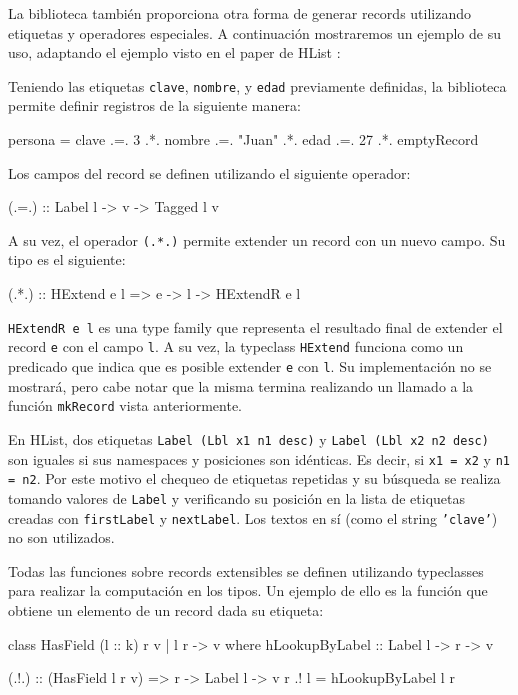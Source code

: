 La biblioteca también proporciona otra forma de generar records utilizando etiquetas y operadores especiales. A continuación mostraremos un ejemplo de su uso, adaptando el ejemplo visto en el paper de HList :

Teniendo las etiquetas \texttt{clave}, \texttt{nombre}, y \texttt{edad} previamente definidas, la biblioteca permite definir registros de la siguiente manera:

\begin{code}
persona = clave .=. 3
  .*. nombre .=. "Juan"
  .*. edad .=. 27
  .*. emptyRecord
\end{code}

Los campos del record se definen utilizando el siguiente operador:

\begin{code}
(.=.) :: Label l -> v -> Tagged l v
\end{code}

A su vez, el operador \texttt{(.*.)} permite extender un record con un nuevo campo. Su tipo es el siguiente:

\begin{code}
(.*.) :: HExtend e l => e -> l -> HExtendR e l
\end{code}

\texttt{HExtendR e l} es una type family que representa el resultado final de extender el record \texttt{e} con el campo \texttt{l}. A su vez, la typeclass \texttt{HExtend} funciona como un predicado que indica que es posible extender \texttt{e} con \texttt{l}. Su implementación no se mostrará, pero cabe notar que la misma termina realizando un llamado a la función \texttt{mkRecord} vista anteriormente.

En HList, dos etiquetas \texttt{Label (Lbl x1 n1 desc)} y \texttt{Label (Lbl x2 n2 desc)} son iguales si sus namespaces y posiciones son idénticas. Es decir, si \texttt{x1 = x2} y \texttt{n1 = n2}. Por este motivo el chequeo de etiquetas repetidas y su búsqueda se realiza tomando valores de \texttt{Label} y verificando su posición en la lista de etiquetas creadas con \texttt{firstLabel} y \texttt{nextLabel}. Los textos en sí (como el string \texttt{'clave'}) no son utilizados.

Todas las funciones sobre records extensibles se definen utilizando typeclasses para realizar la computación en los tipos. Un ejemplo de ello es la función que obtiene un elemento de un record dada su etiqueta:

\begin{code}
class HasField (l :: k) r v | l r -> v where
  hLookupByLabel :: Label l -> r -> v

(.!.) :: (HasField l r v) => r -> Label l -> v
r .! l = hLookupByLabel l r
\end{code}

